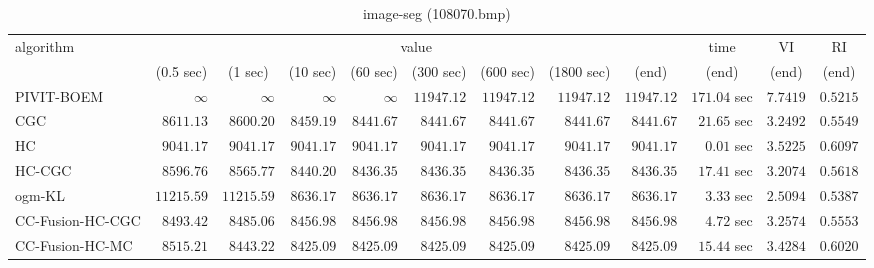 \begin{table}[H]
\scriptsize
\centering
\caption{image-seg (108070.bmp)}
\label{tab:anytimetable-image-seg-108070.bmp}
\begin{tabular}{lrrrrrrrrrrr}
\toprule
           algorithm &                                   \multicolumn{8}{c}{value} & \multicolumn{1}{c}{time}    & \multicolumn{1}{c}{VI}  & \multicolumn{1}{c}{RI} \\  
\cmidrule(lr){2-9}\cmidrule(lr){10-10} \cmidrule(lr){11-11} \cmidrule(lr){12-12}   
                     & \multicolumn{1}{c}{(0.5 sec)} & \multicolumn{1}{c}{(1 sec)} & \multicolumn{1}{c}{(10 sec)} & \multicolumn{1}{c}{(60 sec)} & \multicolumn{1}{c}{(300 sec)} & \multicolumn{1}{c}{(600 sec)} & \multicolumn{1}{c}{(1800 sec)} & \multicolumn{1}{c}{(end)} & \multicolumn{1}{c}{(end)}    & \multicolumn{1}{c}{(end)}   & \multicolumn{1}{c}{(end)}  \\ \midrule 
          PIVIT-BOEM & $\infty$ & $\infty$ & $\infty$ & $\infty$ & $     11947.12$ & $     11947.12$ & $     11947.12$ & $     11947.12$ & $       171.04$ sec    & $       7.7419$  & $       0.5215$ \\ 
                 CGC & $      8611.13$ & $      8600.20$ & $      8459.19$ & $      8441.67$ & $      8441.67$ & $      8441.67$ & $      8441.67$ & $      8441.67$ & $        21.65$ sec    & $       3.2492$  & $       0.5549$ \\ 
                  HC & $      9041.17$ & $      9041.17$ & $      9041.17$ & $      9041.17$ & $      9041.17$ & $      9041.17$ & $      9041.17$ & $      9041.17$ & $         0.01$ sec    & $       3.5225$  & $       0.6097$ \\ 
              HC-CGC & $      8596.76$ & $      8565.77$ & $      8440.20$ & $      8436.35$ & $      8436.35$ & $      8436.35$ & $      8436.35$ & $      8436.35$ & $        17.41$ sec    & $       3.2074$  & $       0.5618$ \\ 
              ogm-KL & $     11215.59$ & $     11215.59$ & $      8636.17$ & $      8636.17$ & $      8636.17$ & $      8636.17$ & $      8636.17$ & $      8636.17$ & $         3.33$ sec    & $       2.5094$  & $       0.5387$ \\ 
    CC-Fusion-HC-CGC & $      8493.42$ & $      8485.06$ & $      8456.98$ & $      8456.98$ & $      8456.98$ & $      8456.98$ & $      8456.98$ & $      8456.98$ & $         4.72$ sec    & $       3.2574$  & $       0.5553$ \\ 
     CC-Fusion-HC-MC & $      8515.21$ & $      8443.22$ & $      8425.09$ & $      8425.09$ & $      8425.09$ & $      8425.09$ & $      8425.09$ & $      8425.09$ & $        15.44$ sec    & $       3.4284$  & $       0.6020$ \\ 

\end{tabular}
\end{table}
